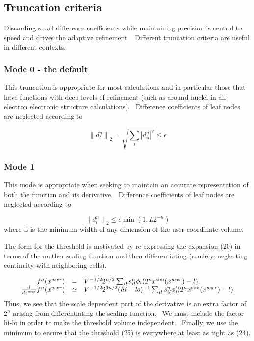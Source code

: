 \documentclass[letterpaper]{book}
\begin{document}
\subsection{Truncation criteria}
\label{ref:sectruncmodes}Discarding small difference coefficients while maintaining precision is central to speed and
drives the adaptive refinement. \ Different truncation criteria are useful in different contexts.

\subsubsection[Mode 0 {}- the default]{\rmfamily Mode 0 - the default}
This truncation is appropriate for most calculations and in particular those that have functions with deep levels of
refinement (such as around nuclei in all-electron electronic structure calculations). \ Difference coefficients of leaf
nodes are neglected according to 

\begin{equation}\label{seq:refText23}
\left\|d_{l}^{n}\right\|_{2}=\sqrt{\sum _{i}\left|d_{il}^{n}\right|^{2}}\le \epsilon 
\end{equation}
\subsubsection{Mode 1}
This mode is appropriate when seeking to maintain an accurate representation of both the function and its derivative.
\ Difference coefficients of leaf nodes are neglected according to 

\begin{equation}\label{seq:refText24}
\left\|d_{l}^{n}\right\|_{2}\le \epsilon \operatorname{min}(1,L2^{-n})
\end{equation}
where L is the minimum width of any dimension of the user coordinate volume.

The form for the threshold is motivated by re-expressing the expansion (20) in terms of the mother scaling function and
then differentiating (crudely, neglecting continuity with neighboring cells). 

\begin{equation}
\begin{matrix}\hfill f^{n}(x^{\mathrm{{\mathit{user}}}})&\text{=}&V^{-1/2}2^{n/2}\sum _{il}s_{il}^{n}\phi
_{i}(2^{n}x^{\mathrm{{sim}}}(x^{\mathrm{{\mathit{user}}}})-l)\hfill\null \\\hfill
\frac{d}{dx^{\mathrm{{\mathit{user}}}}}f^{n}(x^{\mathrm{{\mathit{user}}}})&\simeq
&V^{-1/2}2^{3n/2}(\mathrm{{\mathit{hi}}}-\mathrm{{\mathit{lo}}})^{-1}\sum _{il}s_{il}^{n}\phi
'_{i}(2^{n}x^{\mathrm{{sim}}}(x^{\mathrm{{\mathit{user}}}})-l)\hfill\null \end{matrix}
\end{equation}
Thus, we see that the scale dependent part of the derivative is an extra factor of  $2^{n}$ arising from differentiating
the scaling function. \ We must include the factor hi-lo in order to make the threshold volume independent. \ Finally,
we use the minimum to ensure that the threshold (25) is everywhere at least as tight as (24).
\end{document}
